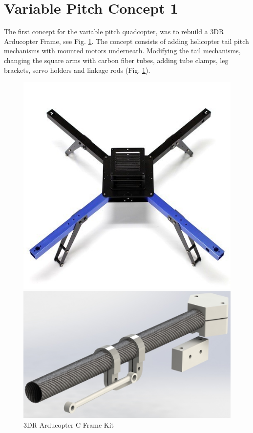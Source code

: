 \newpage
\section{Variable Pitch Concept 1}

The first concept for the variable pitch quadcopter, was to rebuild a 3DR Arducopter Frame, see Fig. \ref{fig:Arducopter}. The concept consists of adding helicopter tail pitch mechanisms with mounted motors underneath. Modifying the tail mechanisms, changing the square arms with carbon fiber tubes, adding tube clamps, leg brackets, servo holders and linkage rods (Fig. \ref{fig:Arducopter}). 
\begin{figure}[h]
        \centering
         \begin{minipage}[b]{0,35\textwidth}
            \includegraphics[width =\textwidth, angle =0]{VAPIQ-PICTURES/3DRArducopterCframeKit}
              \caption{3DR Arducopter C Frame Kit}
           \label{fig:Arducopter}
        \end{minipage}
        \hfill
        \begin{minipage}[b]{0.55\textwidth}
            \includegraphics[width = \textwidth]{VAPIQ-PICTURES/ModForVPQ}

\end{minipage}
\end{figure}
